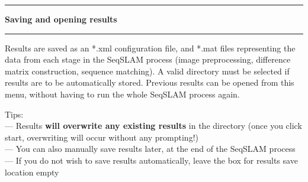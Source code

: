 \noindent\rule{\textwidth}{1pt}
\indent \textbf{Saving and opening results}
\noindent\rule{\textwidth}{1pt}
\smallskip
\parbox{\textwidth}{Results are saved as an *.xml configuration file, and *.mat files representing the data from each stage in the SeqSLAM process (image preprocessing, difference matrix construction, sequence matching). A valid directory must be selected if results are to be automatically stored. Previous results can be opened from this menu, without having to run the whole SeqSLAM process again.}
\bigskip
\parbox{\textwidth}{Tips: \\ --- Results \textbf{will overwrite any existing results} in the directory (once you click start, overwriting will occur without any prompting!) \\ --- You can also manually save results later, at the end of the SeqSLAM process \\ --- If you do not wish to save results automatically, leave the box for results save location empty}
\smallskip
